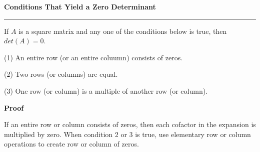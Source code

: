 \nopagenumbers
{\bf Conditions That Yield a Zero Determinant}
\vskip 1mm
\hrule

\vskip 6pt
If $A$ is a square matrix and any one of the conditions below is true, then $det(A)=0$.

\vskip 6pt
(1) An entire row (or an entire coluumn) consists of zeros.

\vskip 6pt
(2) Two rows (or columns) are equal.

\vskip 6pt
(3) One row (or column) is a multiple of another row (or column).

\vskip 10pt
{\bf Proof}

\vskip 6pt
If an entire row or column consists of zeros, then each cofactor in the expansion is multiplied by zero. When condition 2 or 3 is true, use elementary row or column  operations to create row or column of zeros.

\vfill\eject
\bye
